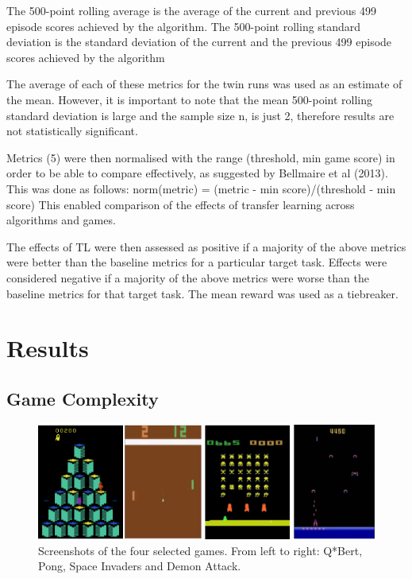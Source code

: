 The 500-point rolling average is the average of the current and previous 499 episode scores achieved by the algorithm. The 500-point rolling standard deviation is the standard deviation of the current and the previous 499 episode scores achieved by the algorithm

The average of each of these metrics for the twin runs was used as an estimate of the mean. However, it is important to note that the mean 500-point rolling standard deviation is large and the sample size n, is just 2, therefore results are not statistically significant. 

Metrics (5) were then normalised with the range (threshold, min game score) in order to be able to compare effectively, as suggested by Bellmaire et al (2013). This was done as follows: norm(metric) = (metric - min score)/(threshold - min score) 
This enabled comparison of the effects of transfer learning across algorithms and games.

The effects of TL were then assessed as positive if a majority of the above metrics were better than the baseline metrics for a particular target task. Effects were considered negative if a majority of the above metrics were worse than the baseline metrics for that target task. The mean reward was used as a tiebreaker.


\section{Results}

\subsection*{Game Complexity}
\begin{figure}[h]
	\includegraphics[width=\textwidth]{fig6.png} 
	\caption{Screenshots of the four selected games. From left to right: Q*Bert, Pong, Space Invaders and Demon Attack.}
\end{figure}

